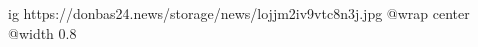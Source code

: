  
 
 
 
 

\ifcmt
  ig https://donbas24.news/storage/news/lojjm2iv9vtc8n3j.jpg
  @wrap center
  @width 0.8
\fi
